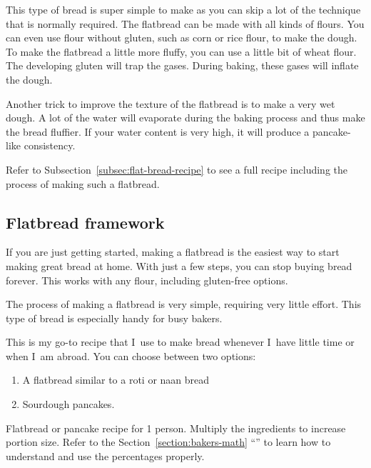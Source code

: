This type of bread is super simple to make as you can skip
a lot of the technique that is normally required. The flatbread
can be made with all kinds of flours. You can even use
flour without gluten, such as corn or rice flour, to make the
dough. To make the flatbread a little more fluffy, you
can use a little bit of wheat flour. The developing gluten
will trap the gases. During baking, these gases will
inflate the dough.

Another trick to improve the texture of the flatbread is to
make a very wet dough. A lot of the water will evaporate
during the baking process and thus make the bread fluffier.
If your water content is very high, it will produce a
pancake-like consistency.

Refer to Subsection~\ref{subsec:flat-bread-recipe}
to see a full recipe including the process of making such a flatbread.

\subsection{Flatbread framework}%
\label{subsec:flat-bread-framework}

If you are just getting started, making a flatbread is the
easiest way to start making great bread at home. With just a
few steps, you can stop buying bread forever. This works with
any flour, including gluten-free options.

\begin{flowchart}[!htb]
\begin{center}
  
  \caption[The process to make a sourdough flatbread]{The process of making a flatbread is very
      simple, requiring very little effort. This type of bread is especially
      handy for busy bakers.}%
  \label{fig:flat-bread-process}
\end{center}
\end{flowchart}

This is my go-to recipe that I~use to make bread whenever
I~have little time or when I~am abroad. You can choose
between two options:
%
\begin{enumerate}
    \item A flatbread similar to a roti or naan bread
    \item Sourdough pancakes.
\end{enumerate}

\begin{table}[!htb]
    \begin{center}
        
        \caption[Flatbread recipe]{Flatbread or pancake recipe for 1 person.
            Multiply the ingredients to increase portion size.  Refer to the
            Section~\ref{section:bakers-math}
            ``'' to learn how to understand and
            use the percentages properly.}%
            \label{tab:flat-bread-ingredients}
    \end{center}
\end{table}

